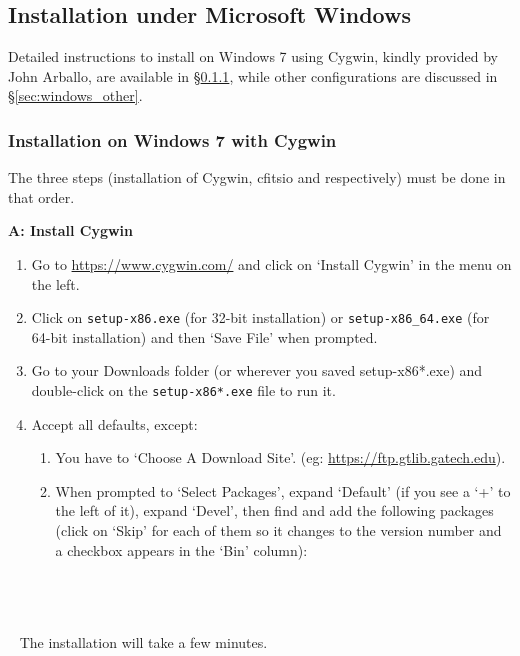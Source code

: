 \documentclass[12pt,twoside]{article}
\begin{document}
\subsection{Installation under Microsoft Windows}
\label{sec:windows}
Detailed instructions to install \healpix on Windows 7 using Cygwin, kindly provided by John Arballo, 
are available in \S\ref{sec:windows_seven}, 
while other configurations are discussed in \S\ref{sec:windows_other}.
\subsubsection{Installation on Windows 7 with Cygwin}
\label{sec:windows_seven}
The three steps (installation of Cygwin, cfitsio and \healpix respectively) must be done in that order.

\textbf{A: Install Cygwin}
\begin{enumerate}
	\setlength{\itemsep}{-1pt}
	\setlength{\parsep}{-10pt}
\item Go to \url{https://www.cygwin.com/}
and click on `Install Cygwin' in the menu on the left.

\item Click on \texttt{setup-x86.exe} (for 32-bit installation) or 
\texttt{setup-x86\_64.exe}
(for 64-bit installation) and then `Save File' when prompted.

\item Go to your Downloads folder (or wherever you saved setup-x86*.exe) and
double-click on the \texttt{setup-x86*.exe} file to run it.

\item Accept all defaults, except:

\begin{enumerate}
	\setlength{\itemsep}{-1pt}
	\setlength{\parsep}{-10pt}
\item
  You have to `Choose A Download Site'. (eg:
  \url{https://ftp.gtlib.gatech.edu}).
\item
  When prompted to `Select Packages', expand `Default' (if you see a `+'
  to the left of it), expand `Devel', then find and add the following
  packages (click on `Skip' for each of them so it changes to the
  version number and a checkbox appears in the `Bin' column):\\
 \\
 \\
 \\
\end{enumerate}
\end{enumerate}
~ The installation will take a few minutes.
\end{document}
